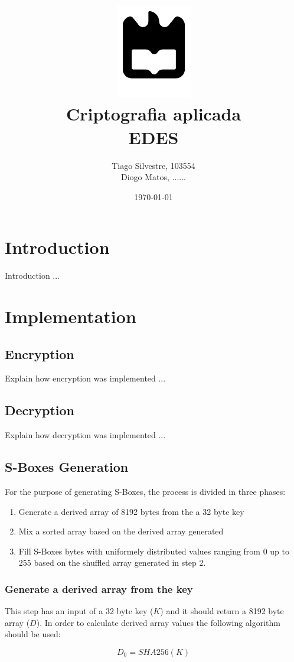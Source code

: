 \documentclass{article} %
\title{%
    \includegraphics[width=0.3\linewidth]{./assets/logo.pdf}\\[20pt]
    \Huge \bfseries Criptografia aplicada \\[10pt]
    \Large EDES
}
\author{Tiago Silvestre, 103554 \\ Diogo Matos, ......}
\date{\today}
\begin{document}
\maketitle

\newpage

\tableofcontents

\section{Introduction}
Introduction ...

\section{Implementation}

\subsection{Encryption}
Explain how encryption was implemented ...

\subsection{Decryption}
Explain how decryption was implemented ...

\subsection{S-Boxes Generation}
For the purpose of generating S-Boxes, the process is divided in three phases:
\begin{enumerate}
  \item Generate a derived array of 8192 bytes from the a 32 byte key
  \item Mix a sorted array based on the derived array generated
  \item Fill S-Boxes bytes with uniformely distributed values ranging from 0 up to 255 based on the shuffled array generated in step 2. 
\end{enumerate}

\subsubsection{Generate a derived array from the key}
This step has an input of a 32 byte key ($K$) and it should return a 8192 byte array ($D$).
In order to calculate derived array values the following algorithm should be used:

\begin{equation}
  D_0 = SHA256(K)
\end{equation}
\end{document}
